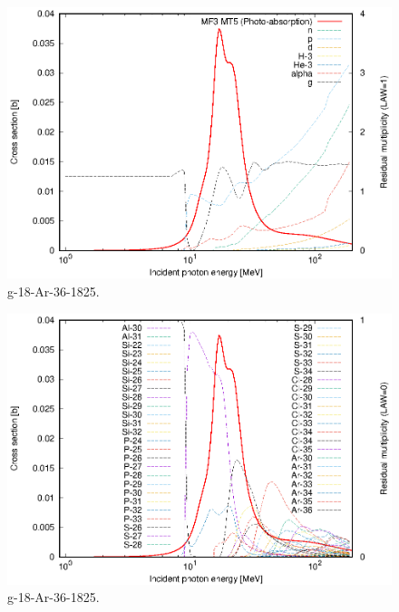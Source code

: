 \begin{figure}
 \includegraphics[width=\linewidth]{eps/g_18-Ar-36_1825.eps}
  \caption{g-18-Ar-36-1825.}
\end{figure}
\begin{figure}
 \includegraphics[width=\linewidth]{eps-law0/g_18-Ar-36_1825.eps}
 \caption{g-18-Ar-36-1825.}
\end{figure}
\newpage \clearpage


